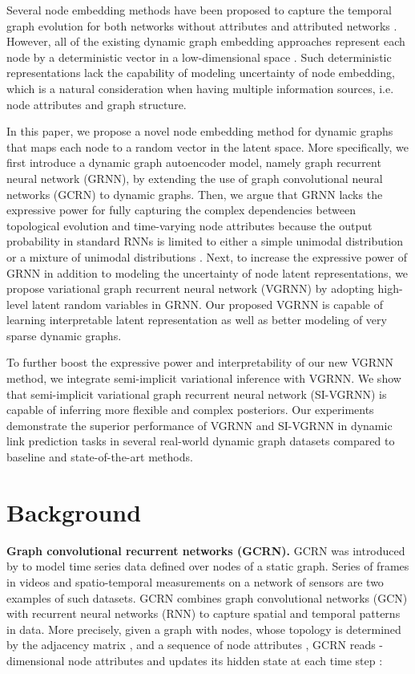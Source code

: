 \documentclass{article}
\begin{document}
Several node embedding methods have been proposed to capture the temporal graph evolution for both networks without attributes \citep{goyal2018dyngem, zhou2018dynamic} and attributed networks \citep{trivedi2018dyrep, li2017attributed}. However, all of the existing dynamic graph embedding approaches represent each node by a deterministic vector in a low-dimensional space \citep{bojchevski2018deep}. 
Such deterministic representations lack the capability of modeling uncertainty of node embedding, which is a natural consideration when having multiple information sources, i.e. node attributes and graph structure. 

In this paper, we propose a novel node embedding method for dynamic graphs that maps each node to a random vector in the latent space. More specifically, we first introduce a dynamic graph autoencoder model, namely graph recurrent neural network (GRNN), by extending the use of graph convolutional neural networks (GCRN) \citep{seo2018structured} to dynamic graphs. Then, we argue that GRNN lacks the expressive power for fully capturing the complex dependencies between topological evolution and time-varying node attributes because the output probability in standard RNNs is limited to either a simple unimodal distribution or a mixture of unimodal distributions \citep{chung2015recurrent, shabanian2017variational, faraccaro2016stochastic, goyal2017zforcing}. Next, to increase the expressive power of GRNN in addition to modeling the uncertainty of node latent representations, we propose variational graph recurrent neural network (VGRNN) by adopting high-level latent random variables in GRNN. Our proposed VGRNN is capable of learning interpretable latent representation as well as better modeling of very sparse dynamic graphs.

To further boost the expressive power and interpretability of our new VGRNN method, we integrate semi-implicit variational inference \cite{yin2018semi} with VGRNN. We show that semi-implicit variational graph recurrent neural network (SI-VGRNN) is capable of inferring more flexible and complex posteriors. 
Our experiments demonstrate the superior performance of VGRNN and SI-VGRNN in dynamic link prediction tasks in several real-world dynamic graph datasets compared to baseline and state-of-the-art methods.

\section{Background}
\noindent\textbf{Graph convolutional recurrent networks (GCRN).} 
GCRN was introduced by \citet{seo2018structured} to model time series data defined over nodes of a static graph. Series of frames in videos and spatio-temporal measurements on a network of sensors are two examples of such datasets. GCRN combines graph convolutional networks (GCN) \cite{defferrard2016convolutional} with recurrent neural networks (RNN) to capture spatial and temporal patterns in data. More precisely,
given a graph  with  nodes, whose topology is determined by  
the adjacency matrix , and a  
sequence of node attributes  , GCRN reads -dimensional node attributes 
and updates its hidden state  at each time step :
\end{document}
